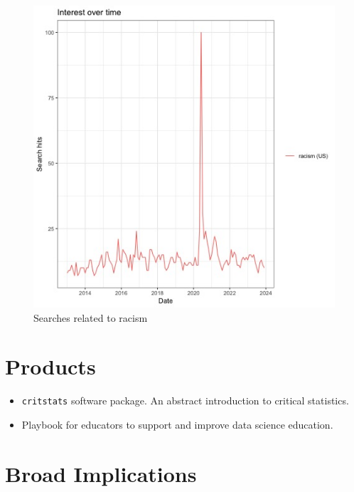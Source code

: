 \documentclass[
  letterpaper,
  DIV=11,
  numbers=noendperiod]{scrartcl}
\begin{document}
\begin{figure}

{\centering \includegraphics{racism-10year.jpeg}

}

\caption{Searches related to racism}

\end{figure}

\hypertarget{products}{%
\section{Products}\label{products}}

\begin{itemize}
\item
  \texttt{critstats} software package. An abstract introduction to
  critical statistics.
\item
  Playbook for educators to support and improve data science education.
\end{itemize}

\hypertarget{broad-implications}{%
\section{Broad Implications}\label{broad-implications}}
\end{document}
